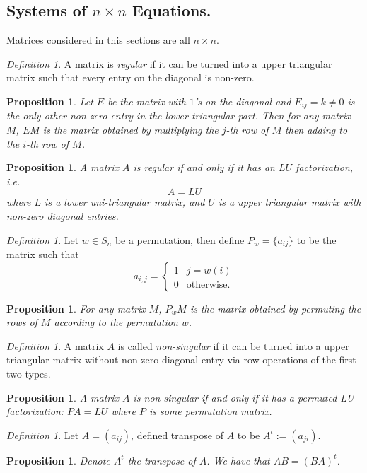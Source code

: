 \documentclass[12pt]{amsart}
\newtheorem{proposition}[theorem]{Proposition}
\theoremstyle{remark}
\newtheorem{definition}[theorem]{Definition}
\numberwithin{equation}{section}
\begin{document}
\subsection{Systems of $n\times n$ Equations.}
Matrices considered in this sections are all $n\times n$.
\begin{definition}
	A matrix is \emph{regular} if it can be turned into a upper triangular matrix such that every entry on the diagonal is non-zero.
\end{definition}
\begin{proposition}
	Let $E$ be the matrix with $1$'s on the diagonal and $E_{ij}=k\neq 0$ is the only other non-zero entry in the lower triangular part. Then for any matrix $M$, $EM$ is the matrix obtained by multiplying the $j$-th row of $M$ then adding to the $i$-th row of $M$.
\end{proposition}

\begin{proposition}
	A matrix $A$ is regular if and only if it has an $LU$ factorization, i.e.
	\[A=LU\]
	where $L$ is a lower uni-triangular matrix, and $U$ is a upper triangular matrix with non-zero diagonal entries.
\end{proposition}

\begin{definition}
	Let $w\in S_n$ be a permutation, then define $P_w=\{a_{ij}\}$ to be the matrix such that $$a_{i,j}=\begin{cases}
		1&j=w(i) \\ 0&  \text{otherwise.}
	\end{cases}$$
\end{definition}

\begin{proposition}
	For any matrix $M$, $P_wM$ is the matrix obtained by permuting the rows of $M$ according to the permutation $w$.
\end{proposition}

\begin{definition}\label{def:non-singular}
	A matrix $A$ is called \emph{non-singular} if it can be turned into a upper triangular matrix without non-zero diagonal entry via row operations of the first two types.
\end{definition}
\begin{proposition}
	A matrix $A$ is non-singular if and only if it has a permuted LU factorization:
	$PA=LU$ where $P$ is some permutation matrix.
\end{proposition}
\begin{definition}\label{def:transpose}
	Let $A=(a_{ij})$, defined transpose of $A$ to be $A^t:=(a_{ji})$.
\end{definition}
\begin{proposition}	Denote $A^t$ the transpose of $A$. We have that $AB = (BA)^t$.
\end{proposition}
\end{document}

